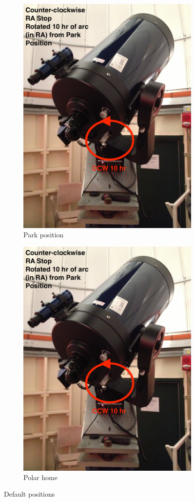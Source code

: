 \documentclass[12pt,titlepage]{article}
\begin{document}
\begin{figure}[H]
    \centering
    \begin{subfigure}[t]{0.5\textwidth}
        \centering
        \includegraphics[width=.8\textwidth]{./images/lx200/intro/ccw_RAstop.jpg}
        \caption{Park position}
    \end{subfigure}%
    \begin{subfigure}[t]{0.5\textwidth}
        \centering
        \includegraphics[width=.8\textwidth]{./images/lx200/intro/ccw_RAstop.jpg}
        \caption{Polar home}
    \end{subfigure}
    \caption{Default positions}
\end{figure}
\end{document}
